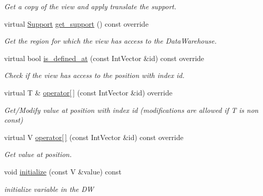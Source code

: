 \begin{DoxyCompactItemize}
\begin{DoxyCompactList}\small\item\em Get a copy of the view and apply translate the support. \end{DoxyCompactList}\item 
virtual \hyperlink{classUintah_1_1PhaseField_1_1Support}{Support} \hyperlink{classUintah_1_1PhaseField_1_1detail_1_1dw__view_3_01ScalarField_3_01T_01_4_00_01VAR_00_01DIM_00_01GN_01_4_a318a539e7857de7ba1271e7bb0ac9437}{get\+\_\+support} () const override
\begin{DoxyCompactList}\small\item\em Get the region for which the view has access to the Data\+Warehouse. \end{DoxyCompactList}\item 
virtual bool \hyperlink{classUintah_1_1PhaseField_1_1detail_1_1dw__view_3_01ScalarField_3_01T_01_4_00_01VAR_00_01DIM_00_01GN_01_4_abd0549624c5f50ed06b714957115743a}{is\+\_\+defined\+\_\+at} (const Int\+Vector \&id) const override
\begin{DoxyCompactList}\small\item\em Check if the view has access to the position with index id. \end{DoxyCompactList}\item 
virtual T \& \hyperlink{classUintah_1_1PhaseField_1_1detail_1_1dw__view_3_01ScalarField_3_01T_01_4_00_01VAR_00_01DIM_00_01GN_01_4_a9d658a184e7bfbce1959c5c939fe3f2e}{operator\mbox{[}$\,$\mbox{]}} (const Int\+Vector \&id) override
\begin{DoxyCompactList}\small\item\em Get/\+Modify value at position with index id (modifications are allowed if T is non const) \end{DoxyCompactList}\item 
virtual V \hyperlink{classUintah_1_1PhaseField_1_1detail_1_1dw__view_3_01ScalarField_3_01T_01_4_00_01VAR_00_01DIM_00_01GN_01_4_a3299f0b41a89170185f4ed27b6d52d67}{operator\mbox{[}$\,$\mbox{]}} (const Int\+Vector \&id) const override
\begin{DoxyCompactList}\small\item\em Get value at position. \end{DoxyCompactList}\item 
void \hyperlink{classUintah_1_1PhaseField_1_1detail_1_1dw__view_3_01ScalarField_3_01T_01_4_00_01VAR_00_01DIM_00_01GN_01_4_a29faf454e5cac7b48bece187d8e1b89c}{initialize} (const V \&value) const
\begin{DoxyCompactList}\small\item\em initialize variable in the DW \end{DoxyCompactList}\end{DoxyCompactItemize}
